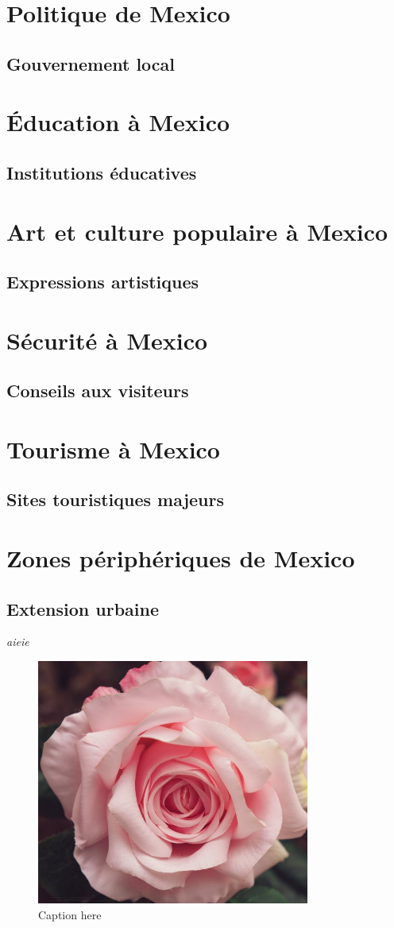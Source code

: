 \documentclass[12pt, a4paper]{article}
\begin{document}
\section{Politique de Mexico}
\subsection{Gouvernement local}
\section{Éducation à Mexico}
\subsection{Institutions éducatives}
\section{Art et culture populaire à Mexico}
\subsection{Expressions artistiques}
\section{Sécurité à Mexico}
\subsection{Conseils aux visiteurs}
\section{Tourisme à Mexico}
\subsection{Sites touristiques majeurs}
\section{Zones périphériques de Mexico}
\subsection{Extension urbaine}
\textit{aieie}


\begin{figure}[h!]
    \centering
    \includegraphics[width=0.8\textwidth]{figures/zones_périphériques_de_mexico/extension_urbaine/default/fig_1.png}
    \caption{Caption here}
    \label{fig:zones_périphériques_de_mexico_extension_urbaine_1}
\end{figure}
\end{document}
